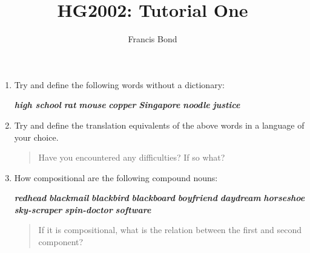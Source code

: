 \documentclass{article}
\title{HG2002: Tutorial One}
\author{Francis Bond}
\date{}%
\newcommand{\lex}[1]{\textbf{\textit{#1}}}
\begin{document}
\maketitle

\begin{enumerate}
\item Try and define the following words without a dictionary:
  \begin{exe}
  \ex \lex{high school}
  \ex \lex{rat}
  \ex \lex{mouse}
  \ex \lex{copper}
  \ex \lex{Singapore}
  \ex \lex{noodle}
  \ex \lex{justice}
  \end{exe}
\item Try and define the translation equivalents of the above words in a language of your choice.
  \begin{quote}
    Have you encountered any difficulties?  If so what?
  \end{quote}
\item How compositional are the following compound nouns:
  \begin{exe}
    \ex \lex{redhead}
    \ex \lex{blackmail}
    \ex \lex{blackbird}
    \ex \lex{blackboard}
    \ex \lex{boyfriend}
    \ex \lex{daydream}
    \ex \lex{horseshoe}
    \ex \lex{sky-scraper}
    \ex \lex{spin-doctor}
    \ex \lex{software}
  \end{exe}
  \begin{quote}
    If it is compositional, what is the relation between the first and
    second component?
  \end{quote}
\end{enumerate}
\end{document}
